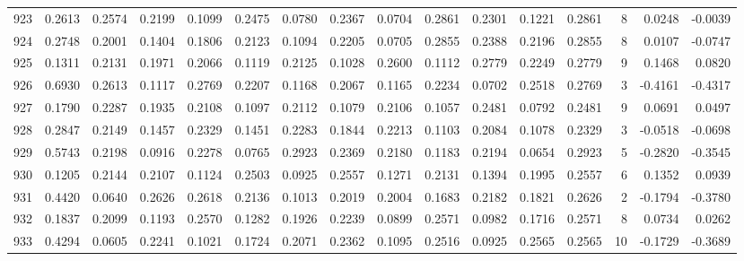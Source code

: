 \begin{tabular}{lrrrrrrrrrrrrrrr}
923 &      0.2613 &  0.2574 &  0.2199 &  0.1099 &  0.2475 &  0.0780 &  0.2367 &  0.0704 &  0.2861 &  0.2301 &   0.1221 &     0.2861 &      8 &                    0.0248 &                    -0.0039 \\
924 &      0.2748 &  0.2001 &  0.1404 &  0.1806 &  0.2123 &  0.1094 &  0.2205 &  0.0705 &  0.2855 &  0.2388 &   0.2196 &     0.2855 &      8 &                    0.0107 &                    -0.0747 \\
925 &      0.1311 &  0.2131 &  0.1971 &  0.2066 &  0.1119 &  0.2125 &  0.1028 &  0.2600 &  0.1112 &  0.2779 &   0.2249 &     0.2779 &      9 &                    0.1468 &                     0.0820 \\
926 &      0.6930 &  0.2613 &  0.1117 &  0.2769 &  0.2207 &  0.1168 &  0.2067 &  0.1165 &  0.2234 &  0.0702 &   0.2518 &     0.2769 &      3 &                   -0.4161 &                    -0.4317 \\
927 &      0.1790 &  0.2287 &  0.1935 &  0.2108 &  0.1097 &  0.2112 &  0.1079 &  0.2106 &  0.1057 &  0.2481 &   0.0792 &     0.2481 &      9 &                    0.0691 &                     0.0497 \\
928 &      0.2847 &  0.2149 &  0.1457 &  0.2329 &  0.1451 &  0.2283 &  0.1844 &  0.2213 &  0.1103 &  0.2084 &   0.1078 &     0.2329 &      3 &                   -0.0518 &                    -0.0698 \\
929 &      0.5743 &  0.2198 &  0.0916 &  0.2278 &  0.0765 &  0.2923 &  0.2369 &  0.2180 &  0.1183 &  0.2194 &   0.0654 &     0.2923 &      5 &                   -0.2820 &                    -0.3545 \\
930 &      0.1205 &  0.2144 &  0.2107 &  0.1124 &  0.2503 &  0.0925 &  0.2557 &  0.1271 &  0.2131 &  0.1394 &   0.1995 &     0.2557 &      6 &                    0.1352 &                     0.0939 \\
931 &      0.4420 &  0.0640 &  0.2626 &  0.2618 &  0.2136 &  0.1013 &  0.2019 &  0.2004 &  0.1683 &  0.2182 &   0.1821 &     0.2626 &      2 &                   -0.1794 &                    -0.3780 \\
932 &      0.1837 &  0.2099 &  0.1193 &  0.2570 &  0.1282 &  0.1926 &  0.2239 &  0.0899 &  0.2571 &  0.0982 &   0.1716 &     0.2571 &      8 &                    0.0734 &                     0.0262 \\
933 &      0.4294 &  0.0605 &  0.2241 &  0.1021 &  0.1724 &  0.2071 &  0.2362 &  0.1095 &  0.2516 &  0.0925 &   0.2565 &     0.2565 &     10 &                   -0.1729 &                    -0.3689 \\

\end{tabular}
